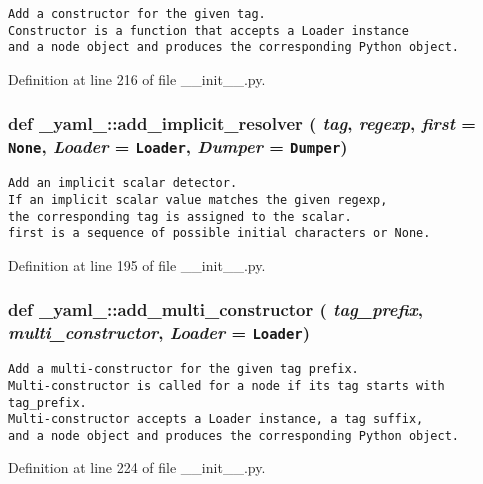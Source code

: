 \footnotesize\begin{verbatim}
Add a constructor for the given tag.
Constructor is a function that accepts a Loader instance
and a node object and produces the corresponding Python object.
\end{verbatim}
\normalsize
 

Definition at line 216 of file \_\-\_\-init\_\-\_\-.py.
\subsubsection{\setlength{\rightskip}{0pt plus 5cm}def \_\-yaml\_\-::add\_\-implicit\_\-resolver ( {\em tag},  {\em regexp},  {\em first} = {\tt None},  {\em Loader} = {\tt Loader},  {\em Dumper} = {\tt Dumper})}\label{namespace__yaml___0ffb5c019ecd10cc222483816dae900d}




\footnotesize\begin{verbatim}
Add an implicit scalar detector.
If an implicit scalar value matches the given regexp,
the corresponding tag is assigned to the scalar.
first is a sequence of possible initial characters or None.
\end{verbatim}
\normalsize
 

Definition at line 195 of file \_\-\_\-init\_\-\_\-.py.
\subsubsection{\setlength{\rightskip}{0pt plus 5cm}def \_\-yaml\_\-::add\_\-multi\_\-constructor ( {\em tag\_\-prefix},  {\em multi\_\-constructor},  {\em Loader} = {\tt Loader})}\label{namespace__yaml___7a2e6be75a9198f845937d87286b0da9}




\footnotesize\begin{verbatim}
Add a multi-constructor for the given tag prefix.
Multi-constructor is called for a node if its tag starts with tag_prefix.
Multi-constructor accepts a Loader instance, a tag suffix,
and a node object and produces the corresponding Python object.
\end{verbatim}
\normalsize
 

Definition at line 224 of file \_\-\_\-init\_\-\_\-.py.
